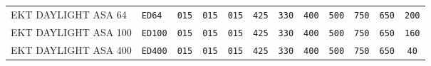 \begin{table}[htb]
\begin{center}
\begin{tabular}{|l|l|c|c|c|c|c|c|c|c|c|c|}
{EKT \scriptsize DAYLIGHT ASA 64} & {\tt ED64} & {\tt 015} & {\tt 015} &
{\tt 015} & {\tt 425} & {\tt 330} & {\tt 400} & {\tt 500} & {\tt 750} & 
{\tt 650} & {\tt 200} \\

% 
% 
% 
{EKT \scriptsize DAYLIGHT ASA 100} & {\tt ED100} & {\tt 015} & {\tt 015} & 
{\tt 015} & {\tt 425} & {\tt 330} & {\tt 400} & {\tt 500} & {\tt 750} &
{\tt 650} & {\tt 160} \\

{EKT \scriptsize DAYLIGHT ASA 400} & {\tt ED400} & {\tt 015} & {\tt 015} & 
{\tt 015} & {\tt 425} & {\tt 330} & {\tt 400} & {\tt 500} & {\tt 750} &
{\tt 650} & {\tt 40} \\


\end{tabular}
\end{center}
\end{table}
